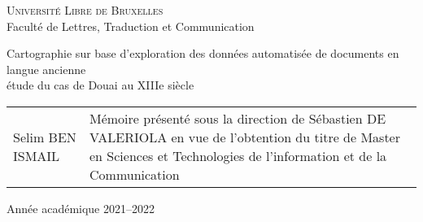 
\begin{titlepage} %
\begin{center} 
\huge{\textsc{Université Libre de Bruxelles}}\\
\vspace{.5cm}
\LARGE{Faculté de Lettres, Traduction et Communication}
\end{center}

\vfill %

\begin{center}
\Huge{Cartographie sur base d’exploration des données automatisée de documents en langue ancienne}\\ %
\vspace{.5cm}
\LARGE{étude du cas de Douai au XIIIe siècle} %
\end{center}

\vfill

\begin{tabular}{b{5.5cm}b{7.5cm}} %
Selim \textsc{BEN ISMAIL} & Mémoire présenté sous la direction de Sébastien \textsc{DE VALERIOLA} en vue de l'obtention du titre de Master en Sciences et Technologies de l'information et de la Communication
\end{tabular}
\vfill
\begin{center}
Année académique 2021--2022 %
\end{center}
\end{titlepage}
